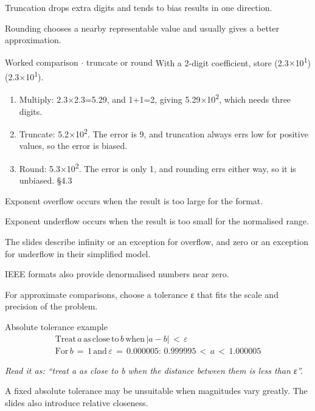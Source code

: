 \documentclass[11pt]{article}
\begin{document}
\begin{keepsection}
\begin{keepsection}
Truncation drops extra digits and tends to bias results in one direction.

Rounding chooses a nearby representable value and usually gives a better approximation.

\begin{workedbox}{Worked comparison \ensuremath{\cdot} truncate or round}
With a 2-digit coefficient, store (2.3\ensuremath{\times}10\textsuperscript{1})(2.3\ensuremath{\times}10\textsuperscript{1}).

\begin{enumerate}
\item Multiply: 2.3\ensuremath{\times}2.3=5.29, and 1+1=2, giving 5.29\ensuremath{\times}10\textsuperscript{2}, which needs three digits.
\item Truncate: 5.2\ensuremath{\times}10\textsuperscript{2}. The error is 9, and truncation always errs low for positive values, so the error is biased.
\item Round: 5.3\ensuremath{\times}10\textsuperscript{2}. The error is only 1, and rounding errs either way, so it is unbiased. \hfill{\small\color{FAUblue}§4.3}
\end{enumerate}
\end{workedbox}

Exponent overflow occurs when the result is too large for the format.

Exponent underflow occurs when the result is too small for the normalised range.

The slides describe infinity or an exception for overflow, and zero or an exception for underflow in their simplified model.

IEEE formats also provide denormalised numbers near zero.

For approximate comparisons, choose a tolerance ε that fits the scale and precision of the problem.

\begin{equationcard}{Absolute tolerance example}
\[ \begin{gathered} \text{Treat}\, {a}\, \text{as}\, \text{close}\, \text{to}\, {b}\, \text{when}\, |{a}-{b}|\, <\, ε \\ \text{For}\, {b}\, =\, 1\, \text{and}\, ε\, =\, 0.000005:\, 0.999995\, <\, {a}\, <\, 1.000005 \end{gathered} \]
{\small \emph{Read it as: “treat a as close to b when the distance between them is less than ε”.}\par A fixed absolute tolerance may be unsuitable when magnitudes vary greatly. The slides also introduce relative closeness.}
\end{equationcard}


\end{keepsection}
\end{keepsection}
\end{document}
